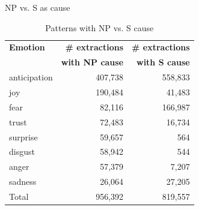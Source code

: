 \documentclass[11pt]{beamer}
\begin{document}
\begin{frame}{NP vs. S as cause}
\begin{table}[h]
\centering
\begin{tabular}{l|r|r}
{\bf Emotion} & {\bf \# extractions} & {\bf \# extractions} \\
{\bf }        & {\bf with NP cause}         & {\bf with S cause}          \\\hline
anticipation  & 407,738                & 558,833                \\
joy           & 190,484                & 41,483                 \\
fear          & 82,116                 & 166,987                \\
trust         & 72,483                 & 16,734                 \\
surprise      & 59,657                 & 564                    \\
disgust       & 58,942                 & 544                    \\
anger         & 57,379                 & 7,207                  \\
sadness       & 26,064                 & 27,205                 \\\hline
Total         & 956,392                &	819,557
\end{tabular}
\caption{Patterns with NP vs. S cause}
\label{tab:patterns-np-vs-s}
\end{table}

\end{frame}
\end{document}
